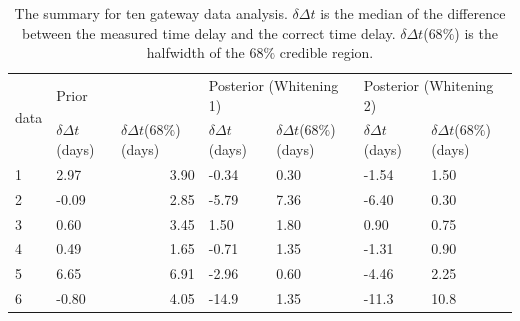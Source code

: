 \documentclass[\docopts]{\docclass}
\begin{document}
\begin{table}[]
\centering
\caption{The summary for ten gateway data analysis. $\delta \Delta t$ is the median of the difference between the measured time delay and the correct time delay. $\delta\Delta t$($68\%$) is the halfwidth of the $68\%$ credible region.}
\label{tab:summary}
\begin{tabular}{|l|l|r|l|l|l|l|}
\hline
\multicolumn{1}{|c|}{\multirow{2}{*}{data}} & \multicolumn{2}{l|}{Prior}                                                    & \multicolumn{2}{l|}{Posterior (Whitening 1)}              & \multicolumn{2}{l|}{Posterior (Whitening 2)}              \\ \cline{2-7}
\multicolumn{1}{|c|}{}                      & $\delta\Delta t$(days) & \multicolumn{1}{l|}{$\delta\Delta t$(68$\%$) (days)} & $\delta\Delta t$ (days) & $\delta\Delta t$(68$\%$) (days) & $\delta\Delta t$ (days) & $\delta\Delta t$(68$\%$) (days) \\ \hline
1                                           & 2.97                   & 3.90                                                 & -0.34                   & 0.30                            & -1.54                   & 1.50                            \\ \hline
2                                           & -0.09                  & 2.85                                                 & -5.79                   & 7.36                            & -6.40                   & 0.30                            \\ \hline
3                                           & 0.60                   & 3.45                                                 & 1.50                    & 1.80                            & 0.90                    & 0.75                            \\ \hline
4                                           & 0.49                   & 1.65                                                 & -0.71                   & 1.35                            & -1.31                   & 0.90                            \\ \hline
5                                           & 6.65                   & 6.91                                                 & -2.96                   & 0.60                            & -4.46                   & 2.25                            \\ \hline
6                                           & -0.80                  & 4.05                                                 & -14.9                   & 1.35                            & -11.3                  & 10.8                            \\ \hline

\end{tabular}
\end{table}
\end{document}
